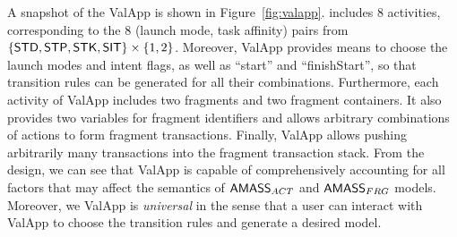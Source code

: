 A snapshot of the ValApp is shown in Figure~\ref{fig:valapp}. 
 includes 8 activities, corresponding to the $8$ (launch mode, task affinity) pairs from $\{{\sf STD}, {\sf STP}, {\sf STK}, {\sf SIT}\} \times \{1,2\}$. Moreover, ValApp provides means to choose the launch modes and intent flags, as well as ``start'' and ``finishStart'', so that transition rules can be generated for all their combinations. 
Furthermore, each activity of ValApp includes two fragments and two fragment containers. It also provides two variables for fragment identifiers and allows arbitrary combinations of actions to form fragment transactions. Finally, ValApp allows pushing arbitrarily many transactions into the fragment transaction stack. 
%
From the design, we can see that ValApp is capable of comprehensively accounting for all factors that may affect the semantics of $\textsf{AMASS}_{ACT}$ and $\textsf{AMASS}_{FRG}$ models. Moreover, we ValApp is \emph{universal} in the sense that a user can interact with ValApp to choose the transition rules and generate a desired {\AMASS} model. 



